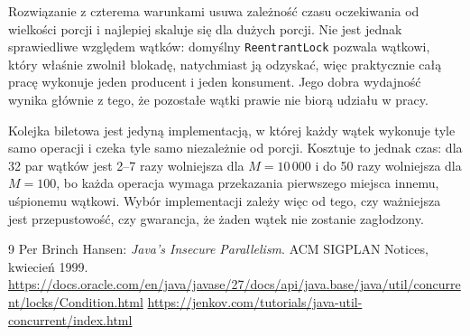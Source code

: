 \documentclass[11pt,a4paper]{article}
\begin{document}
Rozwiązanie z czterema warunkami usuwa zależność czasu oczekiwania od wielkości porcji
i najlepiej skaluje się dla dużych porcji. Nie jest jednak sprawiedliwe względem wątków:
domyślny \texttt{ReentrantLock} pozwala wątkowi, który właśnie zwolnił blokadę, natychmiast
ją odzyskać, więc praktycznie całą pracę wykonuje jeden producent i jeden konsument.
Jego dobra wydajność wynika głównie z tego, że pozostałe wątki prawie nie biorą udziału w pracy.

Kolejka biletowa jest jedyną implementacją, w której każdy wątek wykonuje tyle samo operacji
i czeka tyle samo niezależnie od porcji. Kosztuje to jednak czas: dla 32 par wątków jest 2--7 razy wolniejsza dla $M = 10\,000$
i do 50 razy wolniejsza dla $M = 100$,
bo każda operacja wymaga przekazania pierwszego miejsca innemu, uśpionemu wątkowi.
Wybór implementacji zależy więc od tego, czy ważniejsza jest przepustowość,
czy gwarancja, że żaden wątek nie zostanie zagłodzony.

\begin{thebibliography}{9}
     Per Brinch Hansen: \textit{Java's Insecure Parallelism}. ACM SIGPLAN Notices, kwiecień 1999.
     \url{https://docs.oracle.com/en/java/javase/27/docs/api/java.base/java/util/concurrent/locks/Condition.html}
     \url{https://jenkov.com/tutorials/java-util-concurrent/index.html}
\end{thebibliography}
\end{document}
